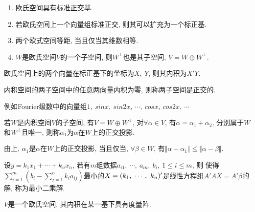 \begin{property}
    \par
    \begin{enumerate}[itemindent=1em]
        \item 欧氏空间具有标准正交基.
        \item 若欧氏空间上一个向量组标准正交, 则其可以扩充为一个标正基.
        \item 两个欧式空间等距, 当且仅当其维数相等.
        \item $W$是欧氏空间$V$的一个子空间, 则$W^{\perp}$也是其子空间, $V=W\oplus W^{\perp}$.
    \end{enumerate}
\end{property}

\begin{example}
    欧氏空间上的两个向量在标正基下的坐标为$X,\ Y$, 则其内积为$X'Y$.
\end{example}


\begin{definition}[空间的正交]
    内积空间的两子空间中的任意两向量内积为零, 则称两子空间是正交的.
\end{definition}

\begin{example}
    例如Fourier级数中的向量组$1,\ sinx,\ sin2x,\ \cdots,\ cosx,\ cos2x,\ \cdots$
\end{example}

\begin{definition}[正交投影]
    若$W$是内积空间$V$的子空间, 有$V=W\oplus W^{\perp}$, 对$\forall \alpha \in V$, 有$\alpha = \alpha{_1}+\alpha{_2}$, 
    分别属于$W$和$W^{\perp}$且唯一, 则称$\alpha{_1}$为$\alpha$在$W$上的正交投影.
\end{definition}

\begin{theorem}[正交投影]
    由上, $\alpha{_1}$是$\alpha$在$W$上的正交投影, 当且仅当, $\forall \beta \in W$, 有$\Vert \alpha - \alpha{_1}\Vert\le \Vert \alpha-\beta\Vert$.
\end{theorem}

\begin{theorem}[最小二乘法]
    设$y=k_1x_1+\cdots+k_nx_n$, 若有$m$组数据$a_{i1},\ \cdots,\ a_{in},\ b_i,\ 1 \le i \le m$, 则
    使得$\sum_{i=1}^m(b_i-\sum_{j=1}^nk_ia_{ij})$最小的$X=({k}{_1},\ \cdots,\ {k}{_{n}})'$是线性方程组$A'AX=A'\beta$的解, 称为最小二乘解.
\end{theorem}

\begin{definition}[内积的度量阵]
    $V$是一个欧氏空间, 其内积在某一基下具有度量阵.
\end{definition}

